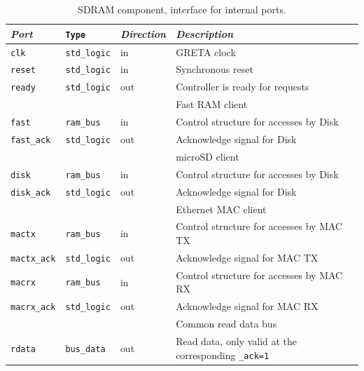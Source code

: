 \documentclass[a4paper]{report}
\begin{document}
\begin{table}
\begin{tabular}{*4l}    \toprule
\emph{Port}         & \texttt{Type}         & \emph{Direction}  & \emph{Description} \\ \midrule
\texttt{clk}        & \texttt{std\_logic}   & in  & GRETA clock \\
\texttt{reset}      & \texttt{std\_logic}   & in  & Synchronous reset \\
\midrule
\texttt{ready}      & \texttt{std\_logic}   & out & Controller is ready for requests \\
\midrule
\midrule
                    &                   &       & Fast RAM client \\
\midrule
\texttt{fast}       & \texttt{ram\_bus}     & in  & Control structure for accesses by Disk \\
\texttt{fast\_ack}  & \texttt{std\_logic}   & out & Acknowledge signal for Disk  \\
\midrule
\midrule
                    &                   &       & microSD client \\
\midrule
\texttt{disk}       & \texttt{ram\_bus}     & in  & Control structure for accesses by Disk \\
\texttt{disk\_ack}  & \texttt{std\_logic}   & out & Acknowledge signal for Disk  \\
\midrule
\midrule
                    &                   &       & Ethernet MAC client \\
\midrule
\texttt{mactx}      & \texttt{ram\_bus}     & in  & Control structure for accesses by MAC TX \\
\texttt{mactx\_ack} & \texttt{std\_logic}   & out & Acknowledge signal for MAC TX \\
\midrule
\texttt{macrx}      & \texttt{ram\_bus}     & in  & Control structure for accesses by MAC RX \\
\texttt{macrx\_ack} & \texttt{std\_logic}   & out & Acknowledge signal for MAC RX \\
\midrule
\midrule
                    &                   &       & Common read data bus \\
\midrule
\texttt{rdata}      & \texttt{bus\_data}    & out & Read data, only valid at the corresponding \texttt{\_ack=1} \\ 
\midrule
\bottomrule
 \hline
\end{tabular}
\caption{SDRAM component, interface for internal ports.}
\label{sdram_interface}
\end{table}
\end{document}

